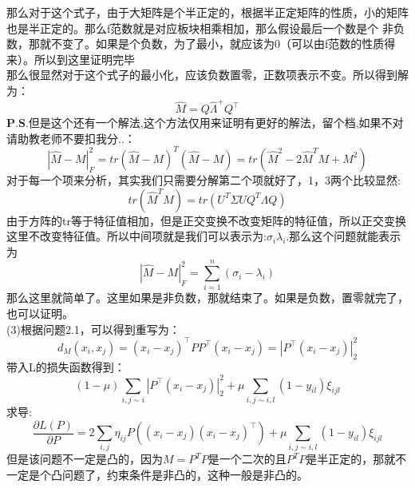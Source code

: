 \documentclass[answers]{exam}  %
\begin{document}
\begin{questions}
\begin{solution}
\begin{parts}
    那么对于这个式子，由于大矩阵是个半正定的，根据半正定矩阵的性质，小的矩阵也是半正定的。那么f范数就是对应板块相乘相加，那么假设最后一个数是个
    非负数，那就不变了。如果是个负数，为了最小，就应该为0（可以由f范数的性质得来）。所以到这里证明完毕\\
    那么很显然对于这个式子的最小化，应该负数置零，正数项表示不变。所以得到解为：\\
    \[
        \hat{M} = Q \hat{\Lambda}^+ Q^\top
    \]  
    $\boldsymbol{P.S}$.但是这个还有一个解法,这个方法仅用来证明有更好的解法，留个档,如果不对请助教老师不要扣我分..：\\
    \[
        |\hat{M} - M|_F^2  = tr(\hat{M} - M)^T(\hat{M} - M) = tr(\hat{M}^2 - 2\hat{M}^T M + M^2)
    \]
    对于每一个项来分析，其实我们只需要分解第二个项就好了，1，3两个比较显然:
    \[
        tr(\hat{M}^T M) = tr(U^T \Sigma U Q^T \Lambda Q)
    \]
    由于方阵的tr等于特征值相加，但是正交变换不改变矩阵的特征值，所以正交变换这里不改变特征值。所以中间项就是我们可以表示为:$\sigma_i \lambda_i$.那么这个问题就能表示为\\
    \[
        |\hat{M} - M|_F^2 = \sum_{i=1}^{n} (\sigma_i - \lambda_i)
    \]
    那么这里就简单了。这里如果是非负数，那就结束了。如果是负数，置零就完了，也可以证明。\\
    (3)根据问题2.1，可以得到重写为：
    \[
        d_M(x_i, x_j) = (x_i - x_j)^\top PP^\top (x_i - x_j) = |P^\top (x_i - x_j)|_2^2
    \]
    带入L的损失函数得到：
    \[
        (1-\mu)\sum_{i,j\sim i} |P^\top (x_i - x_j)|_2^2 +\mu\sum_{i,j\sim i,l}(1-y_{il})\xi_{ijl}
    \]
    求导:
    \[
        \frac{\partial L(P)}{\partial P} = 2 \sum_{i,j} \eta_{ij} P ((x_i - x_j)(x_i - x_j)^\top) + \mu\sum_{i,j\sim i,l}(1-y_{il})\xi_{ijl}
    \]
    但是该问题不一定是凸的，因为$M  = P^T P$是一个二次的且$P^TP$是半正定的，那就不一定是个凸问题了，约束条件是非凸的，这种一般是非凸的。
\end{parts}
\end{solution}

\end{questions}
\end{document}
